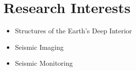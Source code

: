 \section*{Research Interests}

\begin{itemize}
\item Structures of the Earth’s Deep Interior
\item Seismic Imaging
\item Seismic Monitoring
\end{itemize}
